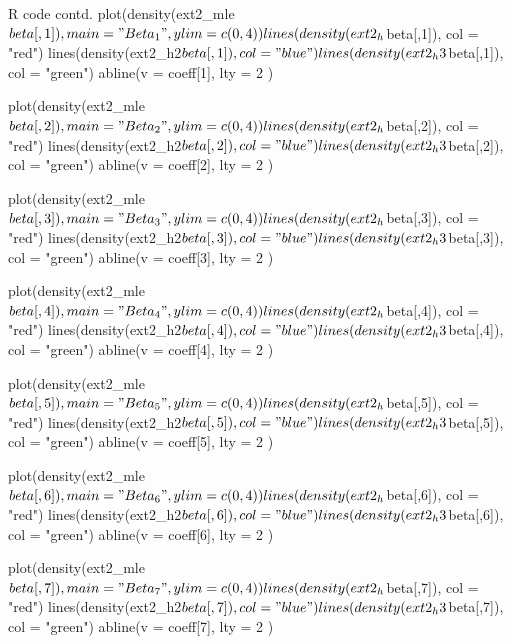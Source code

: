\documentclass{article}
\begin{document}
\begin{sexylisting}{R code contd.}
plot(density(ext2_mle$beta[,1]), main = "Beta_1", ylim = c(0,4))
lines(density(ext2_h$beta[,1]), col = "red")
lines(density(ext2_h2$beta[,1]), col = "blue")
lines(density(ext2_h3$beta[,1]), col = "green")
abline(v = coeff[1], lty = 2 )

plot(density(ext2_mle$beta[,2]), main = "Beta_2", ylim = c(0,4))
lines(density(ext2_h$beta[,2]), col = "red")
lines(density(ext2_h2$beta[,2]), col = "blue")
lines(density(ext2_h3$beta[,2]), col = "green")
abline(v = coeff[2], lty = 2 )

plot(density(ext2_mle$beta[,3]), main = "Beta_3", ylim = c(0,4))
lines(density(ext2_h$beta[,3]), col = "red")
lines(density(ext2_h2$beta[,3]), col = "blue")
lines(density(ext2_h3$beta[,3]), col = "green")
abline(v = coeff[3], lty = 2 )

plot(density(ext2_mle$beta[,4]), main = "Beta_4", ylim = c(0,4))
lines(density(ext2_h$beta[,4]), col = "red")
lines(density(ext2_h2$beta[,4]), col = "blue")
lines(density(ext2_h3$beta[,4]), col = "green")
abline(v = coeff[4], lty = 2 )

plot(density(ext2_mle$beta[,5]), main = "Beta_5", ylim = c(0,4))
lines(density(ext2_h$beta[,5]), col = "red")
lines(density(ext2_h2$beta[,5]), col = "blue")
lines(density(ext2_h3$beta[,5]), col = "green")
abline(v = coeff[5], lty = 2 )

plot(density(ext2_mle$beta[,6]), main = "Beta_6", ylim = c(0,4))
lines(density(ext2_h$beta[,6]), col = "red")
lines(density(ext2_h2$beta[,6]), col = "blue")
lines(density(ext2_h3$beta[,6]), col = "green")
abline(v = coeff[6], lty = 2 )

plot(density(ext2_mle$beta[,7]), main = "Beta_7", ylim = c(0,4))
lines(density(ext2_h$beta[,7]), col = "red")
lines(density(ext2_h2$beta[,7]), col = "blue")
lines(density(ext2_h3$beta[,7]), col = "green")
abline(v = coeff[7], lty = 2 )
\end{sexylisting}
\end{document}
